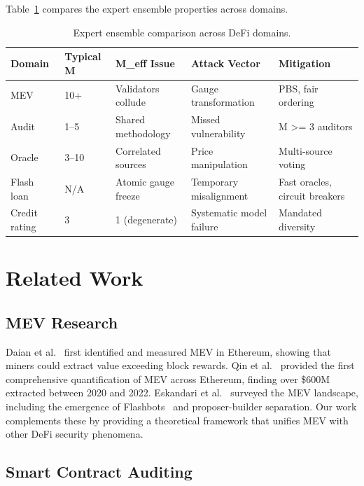 \documentclass[12pt,a4paper]{article}
\theoremstyle{remark}
\begin{document}
Table~\ref{tab:expert_ensemble} compares the expert ensemble properties across
domains.

\begin{table}[htbp]
\centering
\caption{Expert ensemble comparison across DeFi domains.}
\label{tab:expert_ensemble}
\begin{tabular}{lp{2cm}p{2cm}p{2.5cm}p{2.5cm}}
\toprule
\textbf{Domain} & \textbf{Typical M} & \textbf{M\_eff Issue} & \textbf{Attack Vector} & \textbf{Mitigation} \\
\midrule
MEV & 10+ & Validators collude & Gauge transformation & PBS, fair ordering \\
Audit & 1--5 & Shared methodology & Missed vulnerability & M >= 3 auditors \\
Oracle & 3--10 & Correlated sources & Price manipulation & Multi-source voting \\
Flash loan & N/A & Atomic gauge freeze & Temporary misalignment & Fast oracles, circuit breakers \\
Credit rating & 3 & 1 (degenerate) & Systematic model failure & Mandated diversity \\
\bottomrule
\end{tabular}
\end{table}

\section{Related Work}
\label{sec:related}

\subsection{MEV Research}

Daian et al.~\cite{daian2020flashboys} first identified and measured MEV in
Ethereum, showing that miners could extract value exceeding block rewards.
Qin et al.~\cite{qin2022quantifying} provided the first comprehensive
quantification of MEV across Ethereum, finding over \$600M extracted between
2020 and 2022. Eskandari et al.~\cite{eskandari2022mev} surveyed the MEV
landscape, including the emergence of Flashbots~\cite{flashbots2024} and
proposer-builder separation. Our work complements these by providing a
theoretical framework that unifies MEV with other DeFi security phenomena.

\subsection{Smart Contract Auditing}
\end{document}
